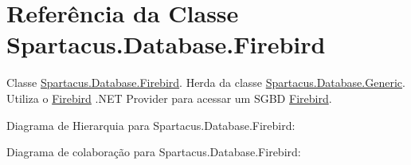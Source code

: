 \hypertarget{classSpartacus_1_1Database_1_1Firebird}{\section{Referência da Classe Spartacus.\+Database.\+Firebird}
\label{classSpartacus_1_1Database_1_1Firebird}
}


Classe \hyperlink{classSpartacus_1_1Database_1_1Firebird}{Spartacus.\+Database.\+Firebird}. Herda da classe \hyperlink{classSpartacus_1_1Database_1_1Generic}{Spartacus.\+Database.\+Generic}. Utiliza o \hyperlink{classSpartacus_1_1Database_1_1Firebird}{Firebird} .N\+E\+T Provider para acessar um S\+G\+B\+D \hyperlink{classSpartacus_1_1Database_1_1Firebird}{Firebird}.  




Diagrama de Hierarquia para Spartacus.\+Database.\+Firebird\+:


Diagrama de colaboração para Spartacus.\+Database.\+Firebird\+:
